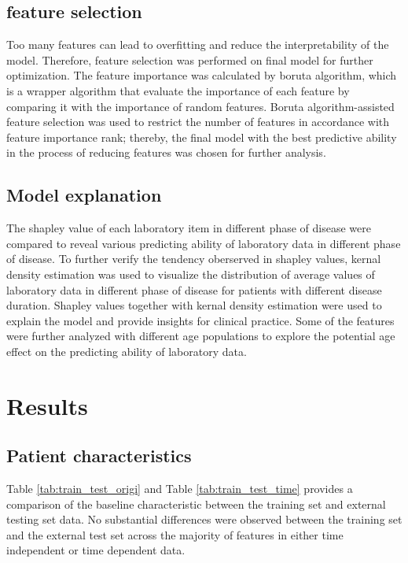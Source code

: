 \documentclass[preprint,12pt,authoryear]{elsarticle}
\begin{document}
\subsection{feature selection}\label{FeatureSelection}

Too many features can lead to overfitting and reduce the interpretability of the model. Therefore, feature selection was performed on final model for further optimization. The feature importance was calculated by boruta algorithm, which is a wrapper algorithm that evaluate the importance of each feature by comparing it with the importance of random features. Boruta algorithm-assisted feature selection was used to restrict the number of features in accordance with feature importance rank; thereby, the final model with the best predictive ability in the process of reducing features was chosen for further analysis. 


\subsection{Model explanation}\label{ModelExplanationMethods}

The shapley value of each laboratory item in different phase of disease were compared to reveal various predicting ability of laboratory data in different phase of disease. To further verify the tendency oberserved in shapley values, kernal density estimation was used to visualize the distribution of average values of laboratory data in different phase of disease for patients with different disease duration. Shapley values together with kernal density estimation were used to explain the model and provide insights for clinical practice. Some of the features were further analyzed with different age populations to explore the potential age effect on the predicting ability of laboratory data.


\section{Results}\label{Results}

\subsection{Patient characteristics}\label{PatientCharacteristics}

Table \ref{tab:train_test_origi} and Table \ref{tab:train_test_time} provides a comparison of the baseline characteristic between the training set and external testing set data. No substantial differences were observed between the training set and the external test set across the majority of features in either time independent or time dependent data.
\end{document}

